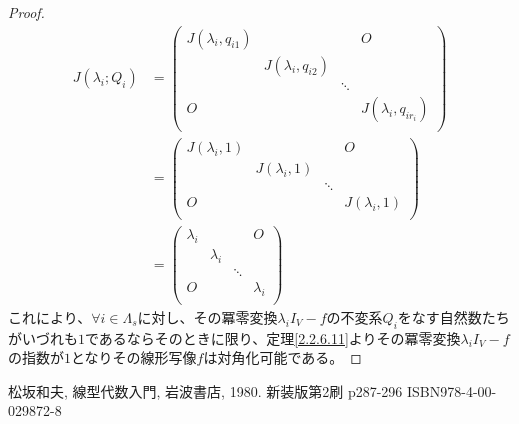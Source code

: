 \documentclass[dvipdfmx]{jsarticle}
\begin{document}
\begin{proof}
\begin{align*}
J\left( \lambda_{i};Q_{i} \right) &= \begin{pmatrix}
J\left( \lambda_{i},q_{i1} \right) & \  & \  & O \\
\  & J\left( \lambda_{i},q_{i2} \right) & \  & \  \\
\  & \  & \ddots & \  \\
O & \  & \  & J\left( \lambda_{i},q_{ir_{i}} \right) \\
\end{pmatrix}\\
&= \begin{pmatrix}
J\left( \lambda_{i},1 \right) & \  & \  & O \\
\  & J\left( \lambda_{i},1 \right) & \  & \  \\
\  & \  & \ddots & \  \\
O & \  & \  & J\left( \lambda_{i},1 \right) \\
\end{pmatrix}\\
&= \begin{pmatrix}
\lambda_{i} & \  & \  & O \\
\  & \lambda_{i} & \  & \  \\
\  & \  & \ddots & \  \\
O & \  & \  & \lambda_{i} \\
\end{pmatrix}
\end{align*}
これにより、$\forall i \in \varLambda_{s}$に対し、その冪零変換$\lambda_{i}I_{V} - f$の不変系$Q_{i}$をなす自然数たちがいづれも$1$であるならそのときに限り、定理\ref{2.2.6.11}よりその冪零変換$\lambda_{i}I_{V} - f$の指数が$1$となりその線形写像$f$は対角化可能である。
\end{proof}
\begin{thebibliography}{50}
    松坂和夫, 線型代数入門, 岩波書店, 1980. 新装版第2刷 p287-296 ISBN978-4-00-029872-8
\end{thebibliography}
\end{document}
